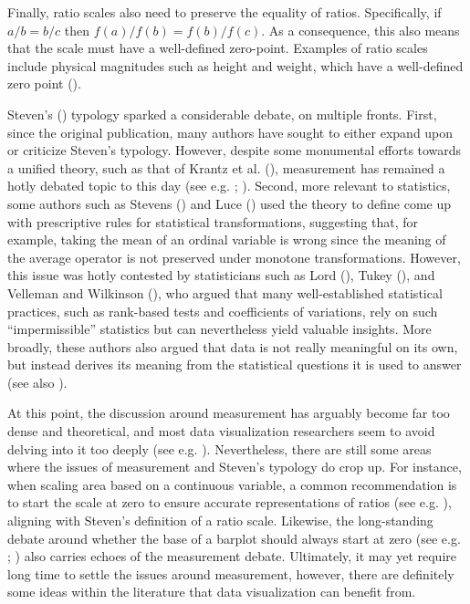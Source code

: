 \documentclass[
]{book}
\begin{document}
Finally, ratio scales also need to preserve the equality of ratios. Specifically, if \(a/b = b/c\) then \(f(a)/f(b) = f(b) / f(c)\). As a consequence, this also means that the scale must have a well-defined zero-point. Examples of ratio scales include physical magnitudes such as height and weight, which have a well-defined zero point ().

Steven's () typology sparked a considerable debate, on multiple fronts. First, since the original publication, many authors have sought to either expand upon or criticize Steven's typology. However, despite some monumental efforts towards a unified theory, such as that of Krantz et al. (), measurement has remained a hotly debated topic to this day (see e.g. ; ). Second, more relevant to statistics, some authors such as Stevens () and Luce () used the theory to define come up with prescriptive rules for statistical transformations, suggesting that, for example, taking the mean of an ordinal variable is wrong since the meaning of the average operator is not preserved under monotone transformations. However, this issue was hotly contested by statisticians such as Lord (), Tukey (), and Velleman and Wilkinson (), who argued that many well-established statistical practices, such as rank-based tests and coefficients of variations, rely on such ``impermissible'' statistics but can nevertheless yield valuable insights. More broadly, these authors also argued that data is not really meaningful on its own, but instead derives its meaning from the statistical questions it is used to answer (see also ).

At this point, the discussion around measurement has arguably become far too dense and theoretical, and most data visualization researchers seem to avoid delving into it too deeply (see e.g. ). Nevertheless, there are still some areas where the issues of measurement and Steven's typology do crop up. For instance, when scaling area based on a continuous variable, a common recommendation is to start the scale at zero to ensure accurate representations of ratios (see e.g. ), aligning with Steven's definition of a ratio scale. Likewise, the long-standing debate around whether the base of a barplot should always start at zero (see e.g. ; ) also carries echoes of the measurement debate. Ultimately, it may yet require long time to settle the issues around measurement, however, there are definitely some ideas within the literature that data visualization can benefit from.
\end{document}
